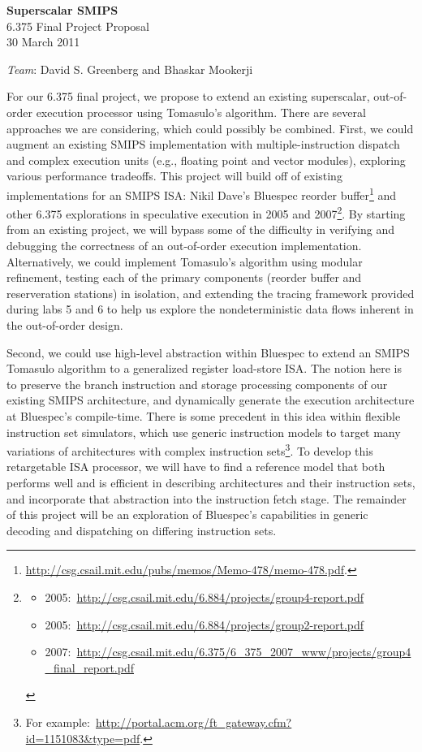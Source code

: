 \documentclass[12pt]{article}
\begin{document}
	\begin{center}
		\textbf{\large Superscalar SMIPS} \\
		6.375 Final Project Proposal\\
		30 March 2011 \\
		
		\vspace{\baselineskip}
		
		\emph{Team}: David S. Greenberg and Bhaskar Mookerji
	\end{center}
	
	For our 6.375 final project, we propose to extend an existing superscalar, out-of-order execution processor using Tomasulo's algorithm. There are several approaches we are considering, which could possibly be combined. First, we could augment an existing SMIPS implementation with multiple-instruction dispatch and complex execution units (e.g., floating point and vector modules), exploring various performance tradeoffs. This project will build off of existing implementations for an SMIPS ISA: Nikil Dave's  Bluespec reorder buffer\footnote{\url{http://csg.csail.mit.edu/pubs/memos/Memo-478/memo-478.pdf}.} and other 6.375 explorations in speculative execution in 2005 and 2007\footnote{\begin{itemize}
		\item 2005:~\url{http://csg.csail.mit.edu/6.884/projects/group4-report.pdf}
		\item 2005:~\url{http://csg.csail.mit.edu/6.884/projects/group2-report.pdf}
		\item 2007:~\url{http://csg.csail.mit.edu/6.375/6_375_2007_www/projects/group4_final_report.pdf}
	\end{itemize}}. By starting from an existing project, we will bypass some of the difficulty in verifying and debugging the correctness of an out-of-order execution implementation. Alternatively, we could implement Tomasulo's algorithm using modular refinement, testing each of the primary components (reorder buffer and reserveration stations) in isolation, and extending the tracing framework provided during labs 5 and 6 to help us explore the nondeterministic data flows inherent in the out-of-order design.
	
	Second, we could use high-level abstraction within Bluespec to extend an SMIPS Tomasulo algorithm to a generalized register load-store ISA. The notion here is to preserve the branch instruction and storage processing components of our existing SMIPS architecture, and dynamically generate the execution architecture at Bluespec's compile-time. There is some precedent in this idea within flexible instruction set simulators, which use generic instruction models to target many variations of architectures with complex instruction sets\footnote{For example:~\url{http://portal.acm.org/ft_gateway.cfm?id=1151083&type=pdf}.}. To develop this retargetable ISA processor, we will have to find a reference model that both performs well and is efficient in describing architectures and their instruction sets, and incorporate that abstraction into the instruction fetch stage. The remainder of this project will be an exploration of Bluespec's capabilities in generic decoding and dispatching on differing instruction sets.
	
\end{document}
